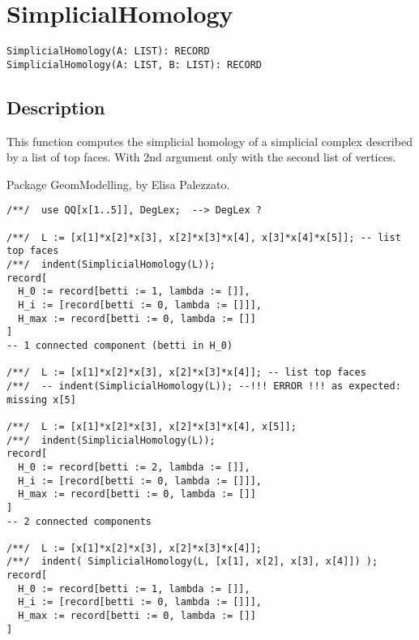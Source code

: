 \documentclass[a4paper]{mybook}
\newenvironment{command}{}{} %
\begin{document}
\section{SimplicialHomology}
\label{SimplicialHomology}
\begin{command} %


\begin{Verbatim}[label=syntax, rulecolor=\color{MidnightBlue},
frame=single]
SimplicialHomology(A: LIST): RECORD
SimplicialHomology(A: LIST, B: LIST): RECORD
\end{Verbatim}


\subsection*{Description}

This function computes the simplicial homology of a simplicial complex
described by a list of top faces.
With 2nd argument only with the second list of vertices.
\par 
Package GeomModelling, by Elisa Palezzato.
\begin{Verbatim}[label=example, rulecolor=\color{PineGreen}, frame=single]
/**/  use QQ[x[1..5]], DegLex;  --> DegLex ?

/**/  L := [x[1]*x[2]*x[3], x[2]*x[3]*x[4], x[3]*x[4]*x[5]]; -- list top faces
/**/  indent(SimplicialHomology(L));
record[
  H_0 := record[betti := 1, lambda := []],
  H_i := [record[betti := 0, lambda := []]],
  H_max := record[betti := 0, lambda := []]
]
-- 1 connected component (betti in H_0)

/**/  L := [x[1]*x[2]*x[3], x[2]*x[3]*x[4]]; -- list top faces
/**/  -- indent(SimplicialHomology(L)); --!!! ERROR !!! as expected: missing x[5]

/**/  L := [x[1]*x[2]*x[3], x[2]*x[3]*x[4], x[5]];
/**/  indent(SimplicialHomology(L));
record[
  H_0 := record[betti := 2, lambda := []],
  H_i := [record[betti := 0, lambda := []]],
  H_max := record[betti := 0, lambda := []]
]
-- 2 connected components

/**/  L := [x[1]*x[2]*x[3], x[2]*x[3]*x[4]];
/**/  indent( SimplicialHomology(L, [x[1], x[2], x[3], x[4]]) );
record[
  H_0 := record[betti := 1, lambda := []],
  H_i := [record[betti := 0, lambda := []]],
  H_max := record[betti := 0, lambda := []]
]
\end{Verbatim}


\end{command} %
\end{document}
